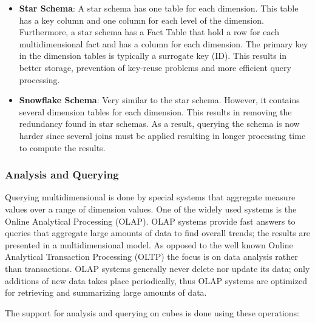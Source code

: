 \begin{itemize}
	\item \textbf{Star Schema}: A star schema has one table for each dimension. This table has a key column and one column for each level of the dimension. Furthermore, a star schema has a Fact Table that hold a row for each multidimensional fact and has a column for each dimension. The primary key in the dimension tables is typically a surrogate key (ID). This results in better storage, prevention of key-reuse problems and more efficient query processing.
	\item \textbf{Snowflake Schema}: Very similar to the star schema. However, it contains several dimension tables for each dimension. This results in removing the redundancy found in star schemas. As a result, querying the schema is now harder since several joins must be applied resulting in longer processing time to compute the results.
\end{itemize}

\subsubsection{Analysis and Querying}

Querying multidimensional is done by special systems that aggregate measure values over a range of dimension values. One of the widely used systems is the Online Analytical Processing (OLAP). OLAP systems provide fast answers to queries that aggregate large amounts of data to find overall trends; the results are presented in a multidimensional model. As opposed to the well known Online Analytical Transaction Processing (OLTP) the focus is on data analysis rather than transactions. OLAP systems generally never delete nor update its data; only additions of new data takes place periodically, thus OLAP systems are optimized for retrieving and summarizing large amounts of data.

The support for analysis and querying on cubes is done using these operations:

